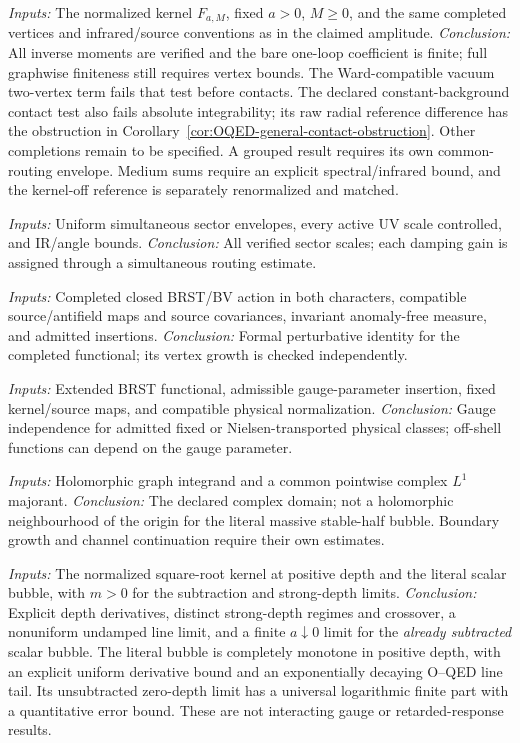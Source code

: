 \documentclass[final,5p,times,twocolumn,numbers,nopreprintline]{elsarticle}
\numberwithin{equation}{section}
\theoremstyle{definition}
\theoremstyle{remark}
\begin{document}
\begin{description}[style=nextline]
\item[O--QED kernel application.] \textit{Inputs:} The normalized kernel
\(F_{a,M}\), fixed \(a>0\), \(M\geq0\), and the same completed
vertices and infrared/source conventions as in the claimed amplitude.
\textit{Conclusion:} All inverse moments are verified and the bare
one-loop coefficient is finite; full graphwise finiteness still requires
vertex bounds. The Ward-compatible vacuum two-vertex term fails that
test before contacts. The declared constant-background contact test
also fails absolute integrability; its raw radial reference difference
has the obstruction in Corollary~\ref{cor:OQED-general-contact-obstruction}.
Other completions remain to be specified. A grouped result requires
its own common-routing envelope.
Medium sums require an explicit spectral/infrared bound, and the
kernel-off reference is separately renormalized and matched.

\item[Forest convergence.] \textit{Inputs:} Uniform simultaneous sector envelopes, every active UV scale
controlled, and IR/angle bounds.
\textit{Conclusion:} All verified sector scales; each damping gain is assigned through
a simultaneous routing estimate.

\item[Slavnov--Taylor identity.] \textit{Inputs:} Completed closed BRST/BV action in both characters, compatible
source/antifield maps and source covariances, invariant anomaly-free
measure, and admitted insertions.
\textit{Conclusion:} Formal perturbative identity for the completed functional;
its vertex growth is checked independently.

\item[Nielsen identity.] \textit{Inputs:} Extended BRST functional, admissible gauge-parameter insertion,
fixed kernel/source maps, and compatible physical normalization.
\textit{Conclusion:} Gauge independence for admitted fixed or Nielsen-transported physical
classes; off-shell functions can depend on the gauge parameter.

\item[Local holomorphy.] \textit{Inputs:} Holomorphic graph integrand and a common pointwise complex
\(L^1\) majorant.
\textit{Conclusion:} The declared complex domain; not a holomorphic neighbourhood of
the origin for the literal massive stable-half bubble. Boundary
growth and channel continuation require their own estimates.

\item[Depth limits and scalar subtraction.] \textit{Inputs:} The normalized
square-root kernel at positive depth and the literal scalar bubble,
with $m>0$ for the subtraction and strong-depth limits.
\textit{Conclusion:} Explicit depth derivatives, distinct strong-depth
regimes and crossover, a nonuniform undamped line limit, and a finite
$a\downarrow0$ limit for the \emph{already subtracted} scalar bubble.
The literal bubble is completely monotone in positive depth,
with an explicit uniform derivative bound and an exponentially
decaying O--QED line tail. Its unsubtracted zero-depth limit has
a universal logarithmic finite part with a quantitative error
bound. These are not interacting gauge or retarded-response results.


\end{description}
\end{document}
